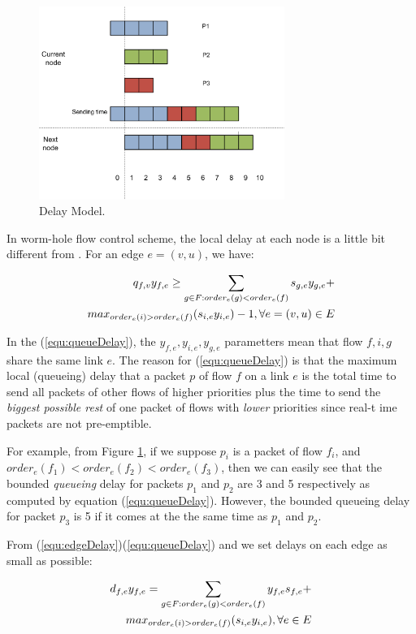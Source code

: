 \documentclass[conference, twocolumn]{IEEEtran}
\theoremstyle{definition}
\begin{document}
\begin{figure}[htbp]
\centering
\includegraphics[width=8cm]{pics/DelayModel.png}
\caption[Delays for packets.]
{Delay Model.}\label{fig:DelayModel}
\end{figure}

In worm-hole flow control scheme, the local delay at each node is a little bit
different from \cite{Ferrari90ascheme}. For an edge $e = (v,u)$, we have:

\begin{eqnarray}\label{equ:queueDelay}
q_{f,v}y_{f,e} \geq \sum_{g \in F:order_{e}(g) <
order_{e}(f)}s_{g,e}y_{g,e} + \notag \\ 
max_{order_{e}(i)>order_{e}(f)}(s_{i,e}y_{i,e})-1, \forall e = (v,u)
\in E
\end{eqnarray}

In the (\ref{equ:queueDelay}), the $y_{f,e}, y_{i,e}, y_{g,e}$ parametters mean
that flow $f, i, g$ share the same link $e$. The reason for
(\ref{equ:queueDelay}) is that the maximum local (queueing) delay  that a packet
$p$ of flow $f$ on a link $e$ is the total time to send all packets of other
flows of higher priorities plus  the time  to send the {\em biggest
possible rest} of one packet of flows with {\em lower} priorities since real-t
ime packets are not pre-emptible.

For example, from Figure \ref{fig:DelayModel}, if we suppose $p_i$ is a packet
of flow $f_i$, and $order_{e}(f_1) < order_{e}(f_2) < order_{e}(f_3)$, then we can easily see that
the bounded {\em queueing} delay for packets $p_1$ and $p_2$ are 3 and 5
respectively as computed by equation (\ref{equ:queueDelay}). However, the
bounded queueing delay for packet $p_3$ is 5 if it comes at the the same time as $p_1$ and $p_2$.

From (\ref{equ:edgeDelay})(\ref{equ:queueDelay}) and we set delays on
each edge as small as possible:

\begin{eqnarray}\label{equ:edgeDelay2}
d_{f,e}y_{f,e} = \sum_{g \in F:order_e(g) < order_e(f)}y_{f,e}s_{f,e} +
\notag\\  
max_{order_{e}(i)>order_{e}(f)}(s_{i,e}y_{i,e}), \forall e \in E
\end{eqnarray}
\end{document}
